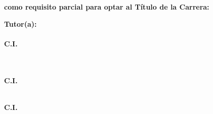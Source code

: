 \large
\begin{center}

    \begin{singlespace}
        \textbf{\MakeUppercase{\datosTitulo}} %
    \end{singlespace}

    \vfill

    \begin{singlespace}
        \textbf{\tipoTrabajo \- como requisito parcial para optar
        al Título de la Carrera:\- \carrera}
    \end{singlespace}

    \vfill

    \normalsize


    \begin{minipage}[t]{0.4\textwidth}
        \centering
        \textbf{Tutor(a):}\\
        \textbf{\MakeUppercase{\datosTutorTitulo \- \datosTutorNombre}}\\
        \textbf{C.I. \datosTutorCI}
    \end{minipage}
    \hfill
    \begin{minipage}[t]{0.4\textwidth}
        \centering
        \etiquetaAutor \\ %
        \textbf{\MakeUppercase{\datosAutoresTitulo \- \datosAutorNombre}}\\
        \textbf{C.I. \datosAutorCI}

        \ifdefined\datosSegAutorNombre
            \vspace{0.8cm} %
            \textbf{\MakeUppercase{\datosAutoresTitulo \- \datosSegAutorNombre}}\\
            \textbf{C.I. \datosSegAutorCI}
        \fi
    \end{minipage}

    \vfill

    \normalsize
    \textbf{\MakeUppercase{\lugarPresentacion}}\\
    \textbf{\MakeUppercase{\fechaPresentacion}} %
\end{center}
